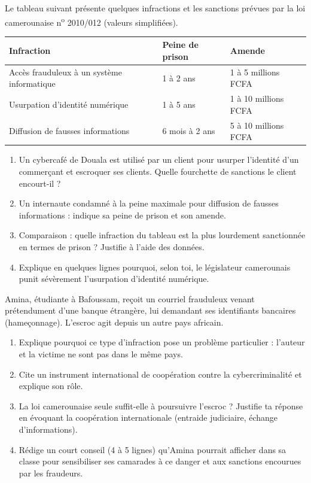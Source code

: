 \documentclass[11pt]{article}
\begin{document}
\begin{exercice}
Le tableau suivant présente quelques infractions et les sanctions prévues par la loi camerounaise n\textsuperscript{o} 2010/012 (valeurs simplifiées).

\begin{center}
\begin{tabular}{|p{6cm}|p{4cm}|p{4cm}|}
\hline
\textbf{Infraction} & \textbf{Peine de prison} & \textbf{Amende} \\
\hline
Accès frauduleux à un système informatique & 1 à 2 ans & 1 à 5 millions FCFA \\
\hline
Usurpation d'identité numérique & 1 à 5 ans & 1 à 10 millions FCFA \\
\hline
Diffusion de fausses informations & 6 mois à 2 ans & 5 à 10 millions FCFA \\
\hline
\end{tabular}
\end{center}

\begin{enumerate}
\item Un cybercafé de Douala est utilisé par un client pour usurper l'identité d'un commerçant et escroquer ses clients. Quelle fourchette de sanctions le client encourt-il ?
\item Un internaute condamné à la peine maximale pour diffusion de fausses informations : indique sa peine de prison et son amende.
\item Comparaison : quelle infraction du tableau est la plus lourdement sanctionnée en termes de prison ? Justifie à l'aide des données.
\item Explique en quelques lignes pourquoi, selon toi, le législateur camerounais punit sévèrement l'usurpation d'identité numérique.
\end{enumerate}
\end{exercice}

\begin{exercice}
Amina, étudiante à Bafoussam, reçoit un courriel frauduleux venant prétendument d'une banque étrangère, lui demandant ses identifiants bancaires (hameçonnage). L'escroc agit depuis un autre pays africain.
\begin{enumerate}
\item Explique pourquoi ce type d'infraction pose un problème particulier : l'auteur et la victime ne sont pas dans le même pays.
\item Cite un instrument international de coopération contre la cybercriminalité et explique son rôle.
\item La loi camerounaise seule suffit-elle à poursuivre l'escroc ? Justifie ta réponse en évoquant la coopération internationale (entraide judiciaire, échange d'informations).
\item Rédige un court conseil (4 à 5 lignes) qu'Amina pourrait afficher dans sa classe pour sensibiliser ses camarades à ce danger et aux sanctions encourues par les fraudeurs.
\end{enumerate}
\end{exercice}
\end{document}
